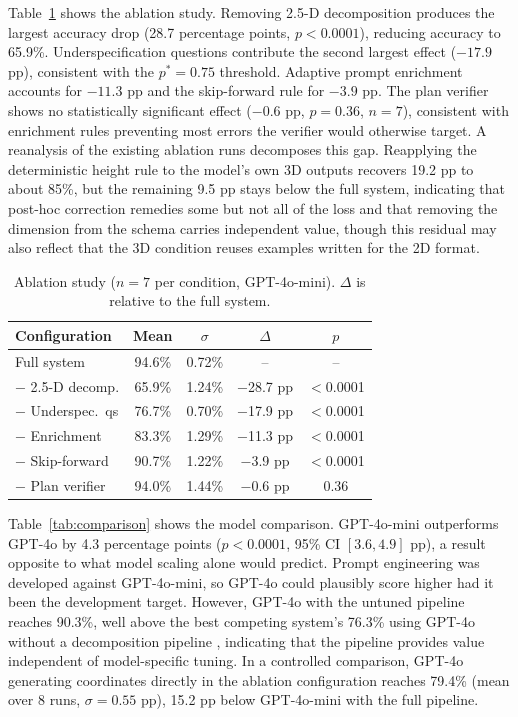 \documentclass[10pt]{article}
\begin{document}
Table~\ref{tab:ablation} shows the ablation study. Removing 2.5-D
decomposition produces the largest accuracy drop (28.7 percentage points,
$p < 0.0001$), reducing accuracy to 65.9\%.
Underspecification questions contribute the second largest effect
($-17.9$ pp), consistent with the $p^* = 0.75$ threshold. Adaptive prompt
enrichment accounts for $-11.3$ pp and the skip-forward rule for $-3.9$
pp. The plan verifier shows no statistically significant effect ($-0.6$
pp, $p = 0.36$, $n = 7$), consistent with enrichment rules preventing
most errors the verifier would otherwise target.
A reanalysis of the existing ablation runs decomposes this gap.
Reapplying the deterministic height rule to the model's own 3D outputs
recovers 19.2 pp to about 85\%, but the remaining 9.5 pp stays below the
full system, indicating that post-hoc correction remedies some but not all
of the loss and that removing the dimension from the schema carries
independent value, though this residual may also reflect that the 3D
condition reuses examples written for the 2D format.

\begin{table}[t]
\centering
\small
\caption{Ablation study ($n\!=\!7$ per condition, GPT-4o-mini). $\Delta$
is relative to the full system.}
\begin{tabular}{@{}lcccc@{}}
\toprule
\textbf{Configuration} & \textbf{Mean} & $\sigma$ & $\Delta$ & $p$ \\
\midrule
Full system  & 94.6\% & 0.72\% & -- & -- \\
$-$ 2.5-D decomp.     & 65.9\% & 1.24\% & $-$28.7 pp & $<$0.0001 \\
$-$ Underspec.\ qs    & 76.7\% & 0.70\% & $-$17.9 pp & $<$0.0001 \\
$-$ Enrichment        & 83.3\% & 1.29\% & $-$11.3 pp & $<$0.0001 \\
$-$ Skip-forward      & 90.7\% & 1.22\% & $-$3.9 pp  & $<$0.0001 \\
$-$ Plan verifier     & 94.0\% & 1.44\% & $-$0.6 pp  & 0.36 \\
\bottomrule
\end{tabular}
\label{tab:ablation}
\end{table}

Table~\ref{tab:comparison} shows the model comparison. GPT-4o-mini
outperforms GPT-4o by 4.3 percentage points ($p < 0.0001$,
95\% CI $[3.6, 4.9]$ pp), a result opposite to what model scaling
alone would predict.
Prompt engineering
was developed against GPT-4o-mini, so GPT-4o could plausibly score higher
had it been the development target. However,
GPT-4o with the untuned pipeline reaches 90.3\%, well above the best
competing system's 76.3\% using GPT-4o without a decomposition pipeline
\parencite{hisandan}, indicating that the pipeline provides value
independent of model-specific tuning.
In a controlled comparison, GPT-4o generating coordinates directly in the
ablation configuration reaches 79.4\% (mean over 8 runs, $\sigma = 0.55$ pp),
15.2 pp below GPT-4o-mini with the full pipeline.
\end{document}
